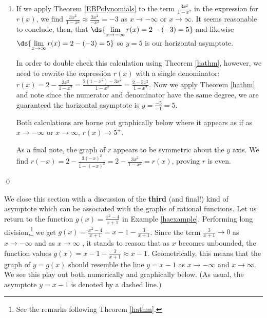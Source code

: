 \documentclass{ximera}
\begin{document}
\begin{example}
\begin{enumerate}
\begin{center}
\end{center} 

\item  If we apply Theorem \ref{EBPolynomials} to the term  $\frac{3x^2}{1-x^2}$ in the expression for $r(x)$, we find   $\frac{3x^2}{1-x^2} \approx \frac{3x^2}{-x^2} = -3$ as $x \rightarrow -\infty$ or $x \rightarrow \infty$.  It  seems reasonable to conclude, then, that  $\ds{\lim_{x \rightarrow  -\infty} r(x) = 2 - (-3) = 5}$ and likewise $\ds{\lim_{x \rightarrow  \infty} r(x) = 2 - (-3) = 5}$ so $y = 5$ is our horizontal asymptote. 

 In order to double check this calculation using  Theorem \ref{hathm}, however, we need to rewrite the expression $r(x)$ with a single denominator:  $r(x) = 2 - \frac{3x^2}{1-x^2} = \frac{2(1-x^2) - 3x^2}{1-x^2} = \frac{2-5x^2}{1-x^2}$.  Now we apply Theorem \ref{hathm}  and note since the numerator and denominator have the same degree, we are guaranteed the horizontal asymptote is $y = \frac{-5}{-1} = 5$.  
 
Both  calculations are borne out graphically below where it appears as if as $x \rightarrow  -\infty$ or $x \rightarrow \infty$, $r(x) \rightarrow 5^{+}$. 

 As a final note, the graph of $r$ appears to be symmetric about the $y$ axis.  We find $r(-x) = 2 - \frac{3(-x)^2}{1-(-x)^2} = 2 - \frac{3x^2}{1-x^2} = r(x)$, proving $r$ is even.

\begin{center}
\end{center} 
\end{enumerate}

\qed

\end{example}


We close this section with a discussion of the \textbf{third} (and final!) kind of asymptote which can be associated with the graphs of rational functions. Let us return to the function $g(x) = \frac{x^2-4}{x+1}$ in Example \ref{haexample}. Performing long division,\footnote{See the remarks following Theorem \ref{hathm}.} we get $g(x) = \frac{x^2-4}{x+1} = x-1 - \frac{3}{x+1}$.  Since the term $\frac{3}{x+1} \rightarrow 0$ as $x \rightarrow - \infty$ and as $x \rightarrow  \infty$ , it stands to reason that as $x$ becomes unbounded, the function values   $g(x) = x-1 - \frac{3}{x+1} \approx x-1$.  Geometrically, this means that the graph of $y=g(x)$ should resemble the line $y = x-1$ as $x \rightarrow  -\infty$ and $x \rightarrow \infty$.  We see this play out both numerically and graphically below. (As usual, the asymptote $y = x-1$ is denoted by a dashed line.)
\end{document}
